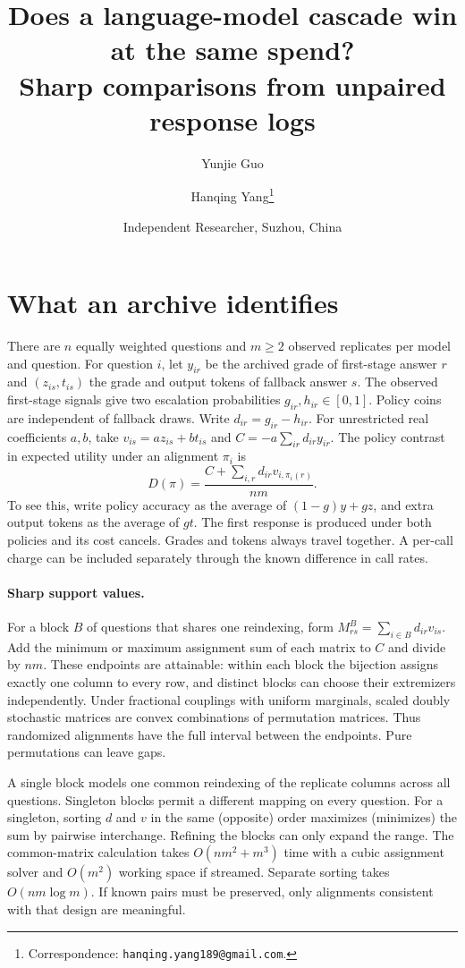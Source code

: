 \documentclass[11pt]{article}
\title{Does a language-model cascade win at the same spend?\\[3pt]\large Sharp comparisons from unpaired response logs}
\author{Yunjie Guo \and Hanqing Yang\thanks{Correspondence: \texttt{hanqing.yang189@gmail.com}.} }
\date{Independent Researcher, Suzhou, China}
\begin{document}
\maketitle



\section{What an archive identifies}
There are $n$ equally weighted questions and $m\ge2$ observed replicates per model and question. For question $i$, let $y_{ir}$ be the archived grade of first-stage answer $r$ and $(z_{is},t_{is})$ the grade and output tokens of fallback answer $s$. The observed first-stage signals give two escalation probabilities $g_{ir},h_{ir}\in[0,1]$. Policy coins are independent of fallback draws. Write $d_{ir}=g_{ir}-h_{ir}$. For unrestricted real coefficients $a,b$, take $v_{is}=a z_{is}+b t_{is}$ and $C=-a\sum_{ir}d_{ir}y_{ir}$. The policy contrast in expected utility under an alignment $\pi_i$ is
\begin{equation}
 D(\pi)=\frac{C+\sum_{i,r} d_{ir}v_{i,\pi_i(r)}}{nm}. \label{eq:contrast}
\end{equation}
To see this, write policy accuracy as the average of $(1-g)y+g z$, and extra output tokens as the average of $g t$. The first response is produced under both policies and its cost cancels. Grades and tokens always travel together. A per-call charge can be included separately through the known difference in call rates.

\paragraph{Sharp support values.} For a block $B$ of questions that shares one reindexing, form $M^B_{rs}=\sum_{i\in B}d_{ir}v_{is}$. Add the minimum or maximum assignment sum of each matrix to $C$ and divide by $nm$. These endpoints are attainable: within each block the bijection assigns exactly one column to every row, and distinct blocks can choose their extremizers independently. Under fractional couplings with uniform marginals, scaled doubly stochastic matrices are convex combinations of permutation matrices. Thus randomized alignments have the full interval between the endpoints. Pure permutations can leave gaps.

A single block models one common reindexing of the replicate columns across all questions. Singleton blocks permit a different mapping on every question. For a singleton, sorting $d$ and $v$ in the same (opposite) order maximizes (minimizes) the sum by pairwise interchange. Refining the blocks can only expand the range. The common-matrix calculation takes $O(nm^2+m^3)$ time with a cubic assignment solver and $O(m^2)$ working space if streamed. Separate sorting takes $O(nm\log m)$. If known pairs must be preserved, only alignments consistent with that design are meaningful.
\end{document}
